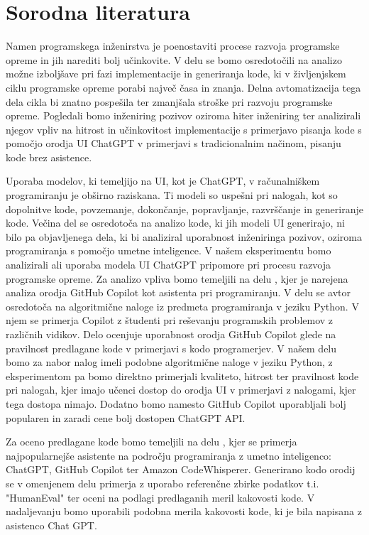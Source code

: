 \documentclass[a4paper,12pt,openright]{book}
\begin{document}
\section{Sorodna literatura}

Namen programskega inženirstva je poenostaviti procese razvoja programske opreme in jih narediti bolj učinkovite. 
V delu se bomo osredotočili na analizo možne izboljšave pri fazi implementacije in generiranja kode, ki v življenjskem ciklu programske opreme porabi največ časa in znanja. Delna avtomatizacija tega dela cikla bi znatno pospešila ter zmanjšala stroške pri razvoju programske opreme. Pogledali bomo inženiring pozivov oziroma hiter inženiring ter analizirali njegov vpliv na hitrost in učinkovitost implementacije s primerjavo pisanja kode s pomočjo orodja UI ChatGPT v primerjavi s tradicionalnim načinom, pisanju kode brez asistence. 

Uporaba modelov, ki temeljijo na UI, kot je ChatGPT, v računalniškem programiranju je obširno raziskana. Ti modeli so uspešni pri nalogah, kot so dopolnitve kode, povzemanje, dokončanje, popravljanje, razvrščanje in generiranje kode. Večina del se osredotoča na analizo kode, ki jih modeli UI generirajo, ni bilo pa objavljenega dela, ki bi analiziral uporabnost inženiringa pozivov, oziroma programiranja s pomočjo umetne inteligence. V našem eksperimentu bomo analizirali ali uporaba modela UI ChatGPT pripomore pri procesu razvoja programske opreme.
\cite{rudolph2023war}
\newline
Za analizo vpliva bomo temeljili na delu \cite{MORADIDAKHEL2023111734}, kjer je narejena analiza orodja GitHub Copilot kot asistenta pri programiranju. V delu se avtor osredotoča na algoritmične naloge iz predmeta programiranja v jeziku Python. V njem se primerja Copilot z študenti pri reševanju programskih problemov z različnih vidikov. Delo ocenjuje uporabnost orodja GitHub Copilot glede na pravilnost predlagane kode v primerjavi s kodo programerjev.
V našem delu bomo za nabor nalog imeli podobne algoritmične naloge v jeziku Python, z eksperimentom pa bomo direktno primerjali kvaliteto, hitrost ter pravilnost kode pri nalogah, kjer imajo učenci dostop do orodja UI v primerjavi z nalogami, kjer tega dostopa nimajo. Dodatno bomo namesto GitHub Copilot uporabljali bolj popularen in zaradi cene bolj dostopen ChatGPT API. 

Za oceno predlagane kode bomo temeljili na delu \cite{yetistiren2023evaluating}, kjer se primerja najpopularnejše asistente na področju programiranja z umetno inteligenco: ChatGPT, GitHub Copilot ter Amazon CodeWhisperer. Generirano kodo orodij se v omenjenem delu primerja z uporabo referenčne zbirke podatkov t.i. "HumanEval" ter oceni na podlagi predlaganih meril kakovosti kode. V nadaljevanju bomo uporabili podobna merila kakovosti kode, ki je bila napisana z asistenco Chat GPT. 
\end{document}
